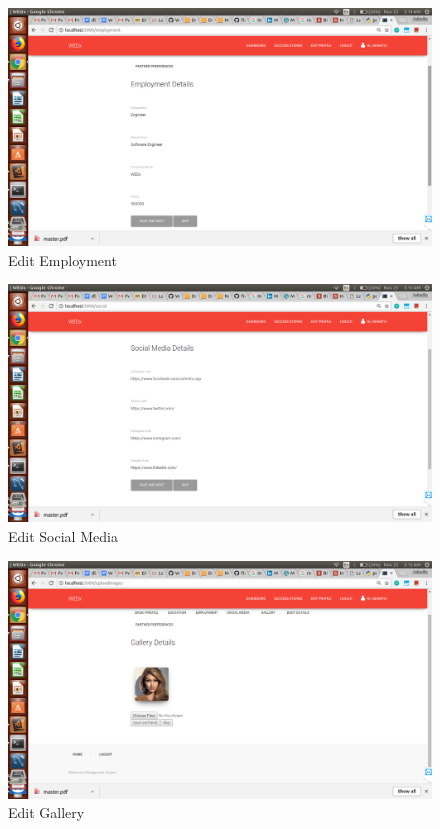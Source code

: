 \documentclass[12pt]{report}
\begin{document}
\begin{figure}[!htb]
    \centering
    \includegraphics[width=1\textwidth]{sc-4.png}
    \caption{Edit Employment}
    \label{fig:Edit Employment}
\end{figure}

\begin{figure}[!htb]
    \centering
    \includegraphics[width=1\textwidth]{sc-5.png}
    \caption{Edit Social Media}
    \label{fig:Edit Social Media}
\end{figure}

\begin{figure}[!htb]
    \centering
    \includegraphics[width=1\textwidth]{sc-6.png}
    \caption{Edit Gallery}
    \label{fig:Edit Gallery}
\end{figure}
\end{document}
